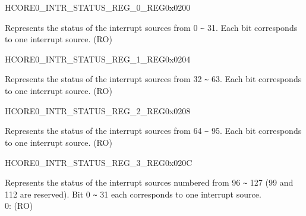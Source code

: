 \begin{register}{H}{CORE0\_INTR\_STATUS\_REG\_0\_REG}{0x0200}\label{regdesc:CORE0INTRSTATUSREG0REG}
%
\regnewline%
\begin{regdesc}\begin{reglist}
\label{fielddesc:CORE0INTRSTATUS0}\item [CORE0\_INTR\_STATUS\_0] Represents the status of the interrupt sources from 0 \verb+~+ 31. Each bit corresponds to one interrupt source.  (RO)
\end{reglist}\end{regdesc}
\end{register}


\begin{register}{H}{CORE0\_INTR\_STATUS\_REG\_1\_REG}{0x0204}\label{regdesc:CORE0INTRSTATUSREG1REG}
%
\regnewline%
\begin{regdesc}\begin{reglist}
\label{fielddesc:CORE0INTRSTATUS1}\item [CORE0\_INTR\_STATUS\_1] Represents the status of the interrupt sources from 32 \verb+~+ 63. Each bit corresponds to one interrupt source. (RO)
\end{reglist}\end{regdesc}
\end{register}


\begin{register}{H}{CORE0\_INTR\_STATUS\_REG\_2\_REG}{0x0208}\label{regdesc:CORE0INTRSTATUSREG2REG}
%
\regnewline%
\begin{regdesc}\begin{reglist}
\label{fielddesc:CORE0INTRSTATUS2}\item [CORE0\_INTR\_STATUS\_2] Represents the status of the interrupt sources from 64 \verb+~+ 95. Each bit corresponds to one interrupt source. (RO)
\end{reglist}\end{regdesc}
\end{register}


\begin{register}{H}{CORE0\_INTR\_STATUS\_REG\_3\_REG}{0x020C}\label{regdesc:CORE0INTRSTATUSREG3REG}
%
\regnewline%
\begin{regdesc}\begin{reglist}
\label{fielddesc:CORE0INTRSTATUS3}\item [CORE0\_INTR\_STATUS\_3] Represents the status of the interrupt sources numbered from 96 \verb+~+ 127 (99 and 112 are reserved). Bit 0 \verb+~+ 31 each corresponds to one interrupt source. \\
0:
(RO)
\end{reglist}\end{regdesc}
\end{register}



